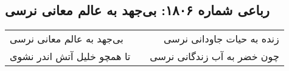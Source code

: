 \begin{center}
\section*{رباعی شماره ۱۸۰۶: بی‌جهد به عالم معانی نرسی}
\label{sec:1806}
\begin{longtable}{l p{0.5cm} r}
بی‌جهد به عالم معانی نرسی
&&
زنده به حیات جاودانی نرسی
\\
تا همچو خلیل آتش اندر نشوی
&&
چون خضر به آب زندگانی نرسی
\\
\end{longtable}
\end{center}
